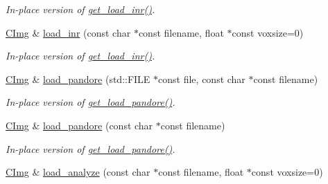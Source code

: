 \begin{DoxyCompactItemize}
\begin{DoxyCompactList}\small\item\em In-\/place version of \hyperlink{structcimg__library_1_1_c_img_a2c9ffc08d42b4756e03ef534f2a107bd}{get\_\-load\_\-inr()}. \item\end{DoxyCompactList}\item 
\hypertarget{structcimg__library_1_1_c_img_a1b81aaede8c8ef2bb5b5cfa10c80ef22}{
\hyperlink{structcimg__library_1_1_c_img}{CImg} \& \hyperlink{structcimg__library_1_1_c_img_a1b81aaede8c8ef2bb5b5cfa10c80ef22}{load\_\-inr} (const char $\ast$const filename, float $\ast$const voxsize=0)}
\label{structcimg__library_1_1_c_img_a1b81aaede8c8ef2bb5b5cfa10c80ef22}

\begin{DoxyCompactList}\small\item\em In-\/place version of \hyperlink{structcimg__library_1_1_c_img_a2c9ffc08d42b4756e03ef534f2a107bd}{get\_\-load\_\-inr()}. \item\end{DoxyCompactList}\item 
\hypertarget{structcimg__library_1_1_c_img_ad9a5fc8140226975ce0ba87ea43e9cf8}{
\hyperlink{structcimg__library_1_1_c_img}{CImg} \& \hyperlink{structcimg__library_1_1_c_img_ad9a5fc8140226975ce0ba87ea43e9cf8}{load\_\-pandore} (std::FILE $\ast$const file, const char $\ast$const filename)}
\label{structcimg__library_1_1_c_img_ad9a5fc8140226975ce0ba87ea43e9cf8}

\begin{DoxyCompactList}\small\item\em In-\/place version of \hyperlink{structcimg__library_1_1_c_img_a7eb5f1206085b6929c455b7f6c46ba50}{get\_\-load\_\-pandore()}. \item\end{DoxyCompactList}\item 
\hypertarget{structcimg__library_1_1_c_img_ab7077bc72bc1b109dd7cd76b04802628}{
\hyperlink{structcimg__library_1_1_c_img}{CImg} \& \hyperlink{structcimg__library_1_1_c_img_ab7077bc72bc1b109dd7cd76b04802628}{load\_\-pandore} (const char $\ast$const filename)}
\label{structcimg__library_1_1_c_img_ab7077bc72bc1b109dd7cd76b04802628}

\begin{DoxyCompactList}\small\item\em In-\/place version of \hyperlink{structcimg__library_1_1_c_img_a7eb5f1206085b6929c455b7f6c46ba50}{get\_\-load\_\-pandore()}. \item\end{DoxyCompactList}\item 
\hypertarget{structcimg__library_1_1_c_img_a470e0987c10a253737062d45bc363767}{
\hyperlink{structcimg__library_1_1_c_img}{CImg} \& \hyperlink{structcimg__library_1_1_c_img_a470e0987c10a253737062d45bc363767}{load\_\-analyze} (const char $\ast$const filename, float $\ast$const voxsize=0)}
\label{structcimg__library_1_1_c_img_a470e0987c10a253737062d45bc363767}


\end{DoxyCompactItemize}

